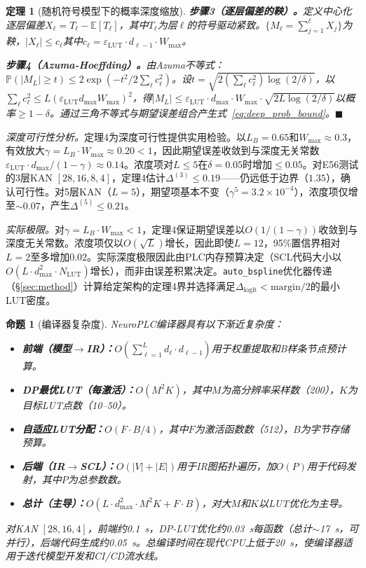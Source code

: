 \documentclass[journal,onecolumn]{IEEEtran}
\newcommand{\neuroplc}{NeuroPLC\xspace}
\theoremstyle{definition}
\theoremstyle{plain}
\newtheorem{theorem}{定理}
\newtheorem{proposition}{命题}
\theoremstyle{remark}
\begin{document}
\begin{theorem}[随机符号模型下的概率深度缩放]
\textbf{步骤3（逐层偏差的鞅）。}定义中心化逐层偏差$X_\ell = T_\ell - \mathbb{E}[T_\ell]$，其中$T_\ell$为层$\ell$的符号驱动紧致。$\{M_\ell = \sum_{j=1}^\ell X_j\}$为鞅，$|X_\ell| \leq c_\ell$其中$c_\ell = \varepsilon_{\text{LUT}} \cdot d_{\ell-1} \cdot W_{\max}$。

\textbf{步骤4（Azuma-Hoeffding）。}由Azuma不等式：$\mathbb{P}(|M_L| \geq t) \leq 2\exp(-t^2 / 2\sum_\ell c_\ell^2)$。设$t = \sqrt{2(\sum_\ell c_\ell^2) \log(2/\delta)}$，以$\sum_\ell c_\ell^2 \leq L (\varepsilon_{\text{LUT}} d_{\max} W_{\max})^2$，得$|M_L| \leq \varepsilon_{\text{LUT}} \cdot d_{\max} \cdot W_{\max} \cdot \sqrt{2L \log(2/\delta)}$以概率$\geq 1-\delta$。通过三角不等式与期望误差组合产生式~\ref{eq:deep_prob_bound}。\hfill $\blacksquare$
\end{theorem}

\noindent\textit{深度可行性分析。}定理4为深度可行性提供实用检验。以$L_B = 0.65$和$W_{\max} \approx 0.3$，有效放大$\gamma = L_B \cdot W_{\max} \approx 0.20 < 1$，因此期望误差收敛到与深度无关常数$\varepsilon_{\text{LUT}} \cdot d_{\max} / (1-\gamma) \approx 0.14$。浓度项对$L \leq 5$在$\delta = 0.05$时增加$\leq 0.05$。对E56测试的3层KAN $[28,16,8,4]$，定理4估计$\Delta^{(3)} \leq 0.19$——仍远低于边界（$1.35$），确认可行性。对5层KAN（$L=5$），期望项基本不变（$\gamma^5 = 3.2\times 10^{-4}$），浓度项仅增至$\sim 0.07$，产生$\Delta^{(5)} \leq 0.21$。

\textit{实际极限。}对$\gamma = L_B \cdot W_{\max} < 1$，定理4保证期望误差以$O(1/(1-\gamma))$收敛到与深度无关常数。浓度项仅以$O(\sqrt{L})$增长，因此即使$L = 12$，95\%置信界相对$L = 2$至多增加$0.02$。实际深度极限因此由PLC内存预算决定（SCL代码大小以$O(L \cdot d_{\max}^2 \cdot N_{\text{LUT}})$增长），而非由误差积累决定。\texttt{auto\_bspline}优化器传递（\S\ref{sec:method}）计算给定架构的定理4界并选择满足$\Delta_{\text{logit}} < \text{margin}/2$的最小LUT密度。

\begin{proposition}[编译器复杂度]
\label{prop:complexity}
\neuroplc{}编译器具有以下渐近复杂度：
\begin{itemize}
    \item \textbf{前端（模型$\to$IR）：}$O(\sum_{\ell=1}^L d_\ell \cdot d_{\ell-1})$用于权重提取和B样条节点预计算。
    \item \textbf{DP最优LUT（每激活）：}$O(M^2 K)$，其中$M$为高分辨率采样数（200），$K$为目标LUT点数（10--50）。
    \item \textbf{自适应LUT分配：}$O(F \cdot B/4)$，其中$F$为激活函数数（512），$B$为字节存储预算。
    \item \textbf{后端（IR$\to$SCL）：}$O(|V| + |E|)$用于IR图拓扑遍历，加$O(P)$用于代码发射，其中$P$为总参数数。
    \item \textbf{总计（主导）：}$O(L \cdot d_{\max}^2 \cdot M^2 K + F \cdot B)$，对大$M$和$K$以LUT优化为主导。
\end{itemize}

对KAN $[28,16,4]$，前端约0.1~s，DP-LUT优化约0.03~s每函数（总计$\sim$17~s，可并行），后端代码生成约0.05~s。总编译时间在现代CPU上低于20~s，使编译器适用于迭代模型开发和CI/CD流水线。
\end{proposition}
\end{document}
